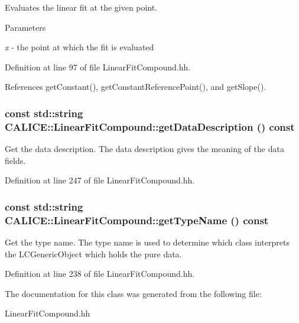 Evaluates the linear fit at the given point. 
\begin{DoxyParams}{Parameters}
\item[{\em x}]-\/ the point at which the fit is evaluated \end{DoxyParams}


Definition at line 97 of file LinearFitCompound.hh.

References getConstant(), getConstantReferencePoint(), and getSlope().
\subsubsection[{getDataDescription}]{\setlength{\rightskip}{0pt plus 5cm}const std::string CALICE::LinearFitCompound::getDataDescription () const\hspace{0.3cm}{\ttfamily  [inline]}}\label{classCALICE_1_1LinearFitCompound_ae44e7e243c8e2a030324852b4c1f1dd2}


Get the data description. The data description gives the meaning of the data fields. 

Definition at line 247 of file LinearFitCompound.hh.
\subsubsection[{getTypeName}]{\setlength{\rightskip}{0pt plus 5cm}const std::string CALICE::LinearFitCompound::getTypeName () const\hspace{0.3cm}{\ttfamily  [inline]}}\label{classCALICE_1_1LinearFitCompound_a1479fcbd624f1452277f65bda2e3f65b}


Get the type name. The type name is used to determine which class interprets the LCGenericObject which holds the pure data. 

Definition at line 238 of file LinearFitCompound.hh.

The documentation for this class was generated from the following file:\begin{DoxyCompactItemize}
\item 
LinearFitCompound.hh\end{DoxyCompactItemize}
